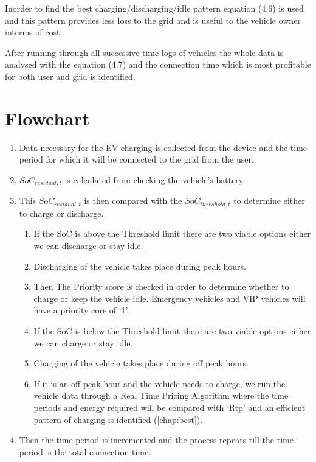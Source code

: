 	\noindent Inorder to find the best charging/discharging/idle pattern equation (4.6) is used and this pattern provides less loss to the grid and is useful to the vehicle owner interms of cost.
	
	\noindent After running through all successive time logs of vehicles the whole data is analysed with the equation (4.7) and the connection time which is most profitable for both user and grid is identified.
	
	
	\section{Flowchart}
	
	\begin{enumerate}
		
		\item Data necessary for the EV charging is collected from the device and the time period for which it will be connected to the grid from the user.
		
		\item $SoC_{residual,t}$ is calculated from checking the vehicle's battery.
		
		\item This $SoC_{residual,t}$ is then compared with the $SoC_{threshold,t}$ to determine either to charge or discharge.
		
	
		\begin{enumerate}

			 \item If the SoC is above the Threshold limit there are two viable options either we can discharge or stay idle.
			 

	 	
				 	\item Discharging of the vehicle takes place during peak hours.
					\item Then The Priority score is checked in order to determine whether to charge or keep the vehicle idle. Emergency vehicles and VIP vehicles will have a priority core of `1'.

				
			 \item If the SoC is below the Threshold limit there are two viable options either we can charge or stay idle.
			 
	
			 		\item Charging of the vehicle takes place during off peak hours.
			 		\item If it is an off peak hour and the vehicle needs to charge, we run the vehicle data through a Real Time Pricing Algorithm where the time periods and energy required will be compared with `Rtp' and an efficient pattern of charging is identified (\ref{chap:best}).
			 		

		\end{enumerate}
		
		\item Then the time period is incremented and the process repeats till the time period is the total connection time.
	\end{enumerate}
	
